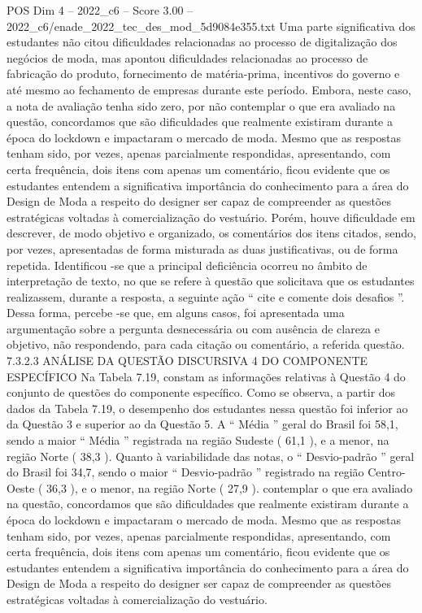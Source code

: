 \begin{textsample}{POS Dim 4 – 2022\_c6 – Score 3.00 – 2022\_c6/enade\_2022\_tec\_des\_mod\_5d9084e355.txt}
Uma parte significativa dos estudantes não citou dificuldades relacionadas ao processo de digitalização dos negócios de moda, mas apontou dificuldades relacionadas ao processo de fabricação do produto, fornecimento de matéria-prima, incentivos do governo e até mesmo ao fechamento de empresas durante este período.
Embora, neste caso, a nota de avaliação tenha sido zero, por não contemplar o que era avaliado na questão, concordamos que são dificuldades que realmente existiram durante a época do lockdown e impactaram o mercado de moda.
Mesmo que as respostas tenham sido, por vezes, apenas parcialmente respondidas, apresentando, com certa frequência, dois itens com apenas um comentário, ficou evidente que os estudantes entendem a significativa importância do conhecimento para a área do Design de Moda a respeito do designer ser capaz de compreender as questões estratégicas voltadas à comercialização do vestuário.
Porém, houve dificuldade em descrever, de modo objetivo e organizado, os comentários dos itens citados, sendo, por vezes, apresentadas de forma misturada as duas justificativas, ou de forma repetida.
Identificou -se que a principal deficiência ocorreu no âmbito de interpretação de texto, no que se refere à questão que solicitava que os estudantes realizassem, durante a resposta, a seguinte ação “ cite e comente dois desafios ”.
Dessa forma, percebe -se que, em alguns casos, foi apresentada uma argumentação sobre a pergunta desnecessária ou com ausência de clareza e objetivo, não respondendo, para cada citação ou comentário, a referida questão. 7.3.2.3 ANÁLISE DA QUESTÃO DISCURSIVA 4 DO COMPONENTE ESPECÍFICO Na Tabela 7.19, constam as informações relativas à Questão 4 do conjunto de questões do componente específico.
Como se observa, a partir dos dados da Tabela 7.19, o desempenho dos estudantes nessa questão foi inferior ao da Questão 3 e superior ao da Questão 5.
A “ Média ” geral do Brasil foi 58,1, sendo a maior “ Média ” registrada na região Sudeste ( 61,1 ), e a menor, na região Norte ( 38,3 ).
Quanto à variabilidade das notas, o “ Desvio-padrão ” geral do Brasil foi 34,7, sendo o maior “ Desvio-padrão ” registrado na região Centro-Oeste ( 36,3 ), e o menor, na região Norte ( 27,9 ). contemplar o que era avaliado na questão, concordamos que são dificuldades que realmente existiram durante a época do lockdown e impactaram o mercado de moda.
Mesmo que as respostas tenham sido, por vezes, apenas parcialmente respondidas, apresentando, com certa frequência, dois itens com apenas um comentário, ficou evidente que os estudantes entendem a significativa importância do conhecimento para a área do Design de Moda a respeito do designer ser capaz de compreender as questões estratégicas voltadas à comercialização do vestuário.

\end{textsample}
